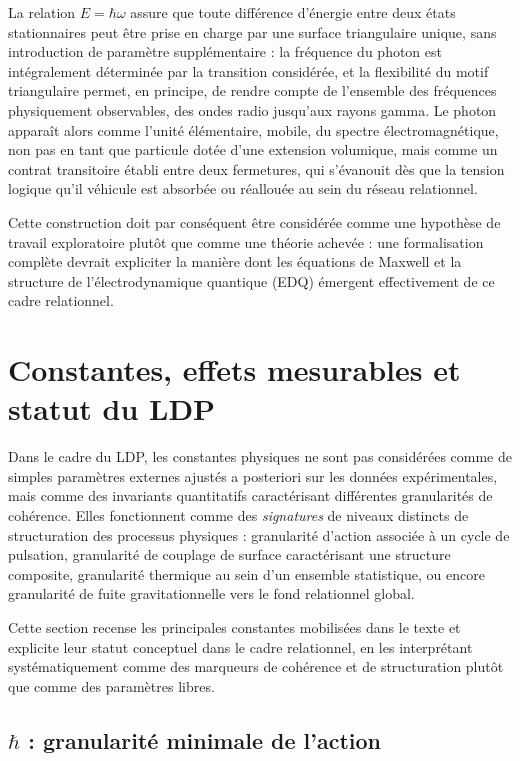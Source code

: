 \documentclass[11pt,a4paper]{article}
\begin{document}
La relation \(E = \hbar\omega\) assure que toute différence d’énergie entre deux états stationnaires peut être prise en charge par une surface triangulaire unique, sans introduction de paramètre supplémentaire : la fréquence du photon est intégralement déterminée par la transition considérée, et la flexibilité du motif triangulaire permet, en principe, de rendre compte de l’ensemble des fréquences physiquement observables, des ondes radio jusqu’aux rayons gamma. Le photon apparaît alors comme l’unité élémentaire, mobile, du spectre électromagnétique, non pas en tant que particule dotée d’une extension volumique, mais comme un contrat transitoire établi entre deux fermetures, qui s’évanouit dès que la tension logique qu’il véhicule est absorbée ou réallouée au sein du réseau relationnel. 

Cette construction doit par conséquent être considérée comme une hypothèse de travail exploratoire plutôt que comme une théorie achevée : une formalisation complète devrait expliciter la manière dont les équations de Maxwell et la structure de l’électrodynamique quantique (EDQ) émergent effectivement de ce cadre relationnel.

\section{Constantes, effets mesurables et statut du LDP}

Dans le cadre du LDP, les constantes physiques ne sont pas considérées comme de simples paramètres externes ajustés a posteriori sur les données expérimentales, mais comme des invariants quantitatifs caractérisant différentes granularités de cohérence. Elles fonctionnent comme des \emph{signatures} de niveaux distincts de structuration des processus physiques : granularité d’action associée à un cycle de pulsation, granularité de couplage de surface caractérisant une structure composite, granularité thermique au sein d’un ensemble statistique, ou encore granularité de fuite gravitationnelle vers le fond relationnel global. 

Cette section recense les principales constantes mobilisées dans le texte et explicite leur statut conceptuel dans le cadre relationnel, en les interprétant systématiquement comme des marqueurs de cohérence et de structuration plutôt que comme des paramètres libres.

\subsection{\texorpdfstring{\(\hbar\)}{hbar} : granularité minimale de l’action}
\end{document}

